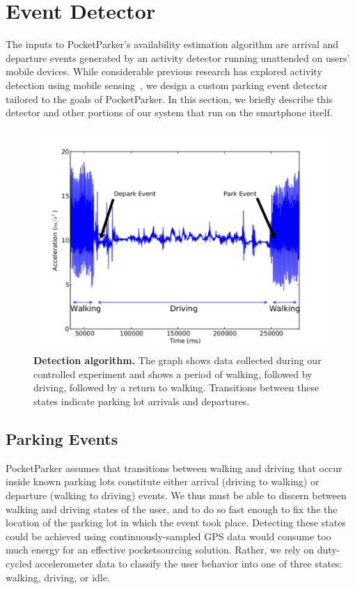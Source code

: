 \section{Event Detector}

The inputs to PocketParker's availability estimation algorithm are arrival and
departure events generated by an activity detector running unattended on users'
mobile devices.  While considerable previous research has explored activity
detection using mobile sensing~\cite{Constandache:2010:DYS, Keally:2011:PTP,
Reddy:2010:UMP, Yang:2011:DDP, Wang:2009:FEE}, we design a custom parking event
detector tailored to the goals of PocketParker.  In this section, we briefly
describe this detector and other portions of our system that run on the
smartphone itself.  

\begin{figure}[t]
  \centering
  \includegraphics[width=0.8\columnwidth]{./figures/detection-cropped.pdf}

  \caption{\textbf{Detection algorithm.} The graph shows data collected
    during our controlled experiment and shows a period of walking, followed by
    driving, followed by a return to walking. Transitions between these states
  indicate parking lot arrivals and departures.}

  \label{fig-detection}
\end{figure}

\subsection{Parking Events}

PocketParker assumes that transitions between walking and driving that occur
inside known parking lots constitute either arrival (driving to walking) or
departure (walking to driving) events.  We thus must be able to discern
between walking and driving states of the user, and to do so fast enough to
fix the the location of the parking lot in which the event took place.
Detecting these states could be achieved using continuously-sampled GPS data
would consume too much energy for an effective pocketsourcing solution.
Rather, we rely on duty-cycled accelerometer data to classify the user
behavior into one of three states: walking, driving, or idle.

